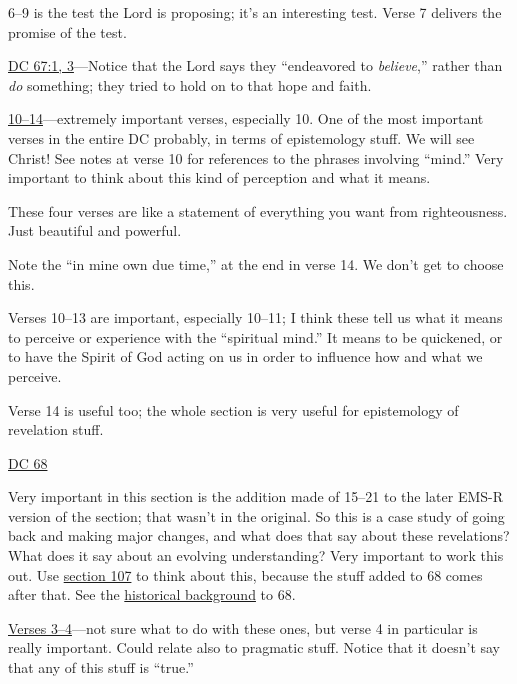 \begin{compactdesc}
\begin{compactitem}
\begin{compactitem}
							\item 6--9 is the test the Lord is proposing; it's an interesting test. Verse 7 delivers the promise of the test.
						\end{compactitem}
					\item \hyperref[DC67-1]{DC 67:1, 3}---Notice that the Lord says they ``endeavored to \textit{believe},'' rather than \textit{do} something; they tried to hold on to that hope and faith.
					\item \hyperref[DC67-10]{10--14}---extremely important verses, especially 10. One of the most important verses in the entire DC probably, in terms of epistemology stuff. We will see Christ! See notes at verse 10 for references to the phrases involving ``mind.'' Very important to think about this kind of perception and what it means.
						\begin{compactitem}
							\item These four verses are like a statement of everything you want from righteousness. Just beautiful and powerful.
							\item Note the ``in mine own due time,'' at the end in verse 14. We don't get to choose this.
						\end{compactitem}
					\item Verses 10--13 are important, especially 10--11; I think these tell us what it means to perceive or experience with the ``spiritual mind.'' It means to be quickened, or to have the Spirit of God acting on us in order to influence how and what we perceive.
					\item Verse 14 is useful too; the whole section is very useful for epistemology of revelation stuff.
				\end{compactitem}
			\item \hyperref[DC68]{DC 68}
				\begin{compactitem}
					\item Very important in this section is the addition made of 15--21 to the later EMS-R version of the section; that wasn't in the original. So this is a case study of going back and making major changes, and what does that say about these revelations? What does it say about an evolving understanding? Very important to work this out. Use \hyperref[DC107]{section 107} to think about this, because the stuff added to 68 comes after that. See the \hyperref[DC68-HB]{historical background} to 68.
					\item \hyperref[DC68-3]{Verses 3--4}---not sure what to do with these ones, but verse 4 in particular is really important. Could relate also to pragmatic stuff. Notice that it doesn't say that any of this stuff is ``true.''

\end{compactitem}
\end{compactdesc}

